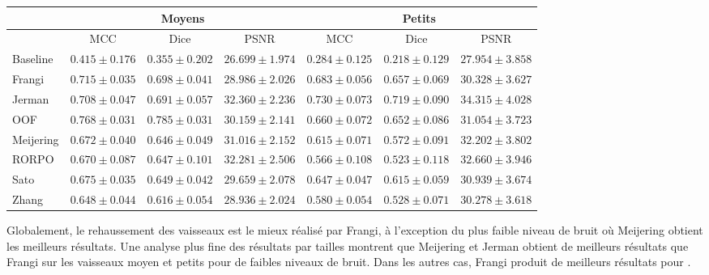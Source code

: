 \begin{table}[H]
\begin{centering}
{\begin{tabular}{lccc|ccc}
            \hline
            & \multicolumn{3}{c}{Moyens}                         & \multicolumn{3}{c}{Petits}                           \\
            \hline
            & MCC  & Dice & PSNR & MCC & Dice & PSNR  \\
            Baseline	    & $ 0.415 \pm 0.176 $ & $ 0.355 \pm 0.202 $ & $	26.699 \pm 1.974 $ & $	0.284 \pm 0.125 $ & $ 0.218 \pm 0.129 $ & $ 27.954 \pm 3.858 $ \\
            Frangi	    & $ 0.715 \pm 0.035 $ & $ 0.698 \pm 0.041 $ & $	28.986 \pm 2.026 $ & $	0.683 \pm 0.056 $ & $ 0.657 \pm 0.069 $ & $ 30.328 \pm 3.627 $ \\
            Jerman	    & $ 0.708 \pm 0.047 $ & $ 0.691 \pm 0.057 $ & $	32.360 \pm 2.236 $ & $	0.730 \pm 0.073 $ & $ 0.719 \pm 0.090 $ & $ 34.315 \pm 4.028 $ \\
            OOF	        & $ 0.768 \pm 0.031 $ & $ 0.785 \pm 0.031 $ & $	30.159 \pm 2.141 $ & $	0.660 \pm 0.072 $ & $ 0.652 \pm 0.086 $ & $ 31.054 \pm 3.723 $ \\
            Meijering	    & $ 0.672 \pm 0.040 $ & $ 0.646 \pm 0.049 $ & $	31.016 \pm 2.152 $ & $	0.615 \pm 0.071 $ & $ 0.572 \pm 0.091 $ & $ 32.202 \pm 3.802 $ \\
            RORPO	        & $ 0.670 \pm 0.087 $ & $ 0.647 \pm 0.101 $ & $	32.281 \pm 2.506 $ & $	0.566 \pm 0.108 $ & $ 0.523 \pm 0.118 $ & $ 32.660 \pm 3.946 $ \\
            Sato	        & $ 0.675 \pm 0.035 $ & $ 0.649 \pm 0.042 $ & $	29.659 \pm 2.078 $ & $	0.647 \pm 0.047 $ & $ 0.615 \pm 0.059 $ & $ 30.939 \pm 3.674 $ \\
            Zhang	        & $ 0.648 \pm 0.044 $ & $ 0.616 \pm 0.054 $ & $	28.936 \pm 2.024 $ & $	0.580 \pm 0.054 $ & $ 0.528 \pm 0.071 $ & $ 30.278 \pm 3.618 $ \\
  \hline
  \end{tabular}
  }
  \end{centering} 
\end{table}

Globalement, le rehaussement des vaisseaux est le mieux réalisé par Frangi, à l'exception du plus faible niveau de bruit où Meijering obtient les meilleurs résultats. Une analyse plus fine des résultats par tailles montrent que Meijering et Jerman obtient de meilleurs résultats que Frangi sur les vaisseaux moyen et petits pour de faibles niveaux de bruit.  Dans les autres cas, Frangi produit de meilleurs résultats pour \maskvessel.


